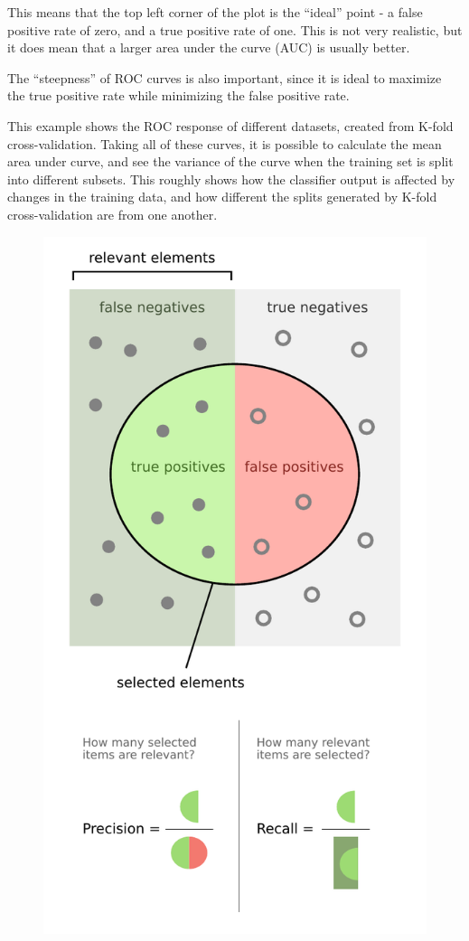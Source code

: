 \documentclass[11pt]{article}
\theoremstyle{plain}
\theoremstyle{definition}
\begin{document}
This means that the top left corner of the plot is the “ideal” point - a false positive rate of zero, and a true positive rate of one. This is not very realistic, but it does mean that a larger area under the curve (AUC) is usually better.

The “steepness” of ROC curves is also important, since it is ideal to maximize the true positive rate while minimizing the false positive rate.

This example shows the ROC response of different datasets, created from K-fold cross-validation. Taking all of these curves, it is possible to calculate the mean area under curve, and see the variance of the curve when the training set is split into different subsets. This roughly shows how the classifier output is affected by changes in the training data, and how different the splits generated by K-fold cross-validation are from one another.

\begin{figure}[h!]
	\includegraphics{./img/Precisionrecall.pdf}
\end{figure}
\end{document}
